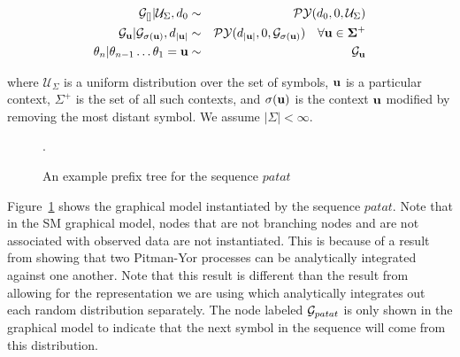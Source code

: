 \begin{eqnarray*}
	\G_{[]} | \mathcal{U}_{\Sigma}, d_0 &\sim& \PY(d_0, 0, \mathcal{U}_{\Sigma }) \\
	\G_{\bf{u}} | \G_{\sigma(\bf{u})}, d_{|\bf{u}|} &\sim& \PY(d_{|\bf{u}|}, 0, \G_{\sigma(\bf{u})}) \hspace{.35cm} \forall \bf{u} \in \Sigma^+\\
	\theta_n | \theta_{n-1}  \ldots \theta_1 = \bf{u} &\sim& \G_{\bf{u}}
\end{eqnarray*}

where $\mathcal{U}_{\Sigma }$ is a uniform distribution over the set of symbols, $\bf{u}$ is a particular context, $\Sigma^+$ is the set of all such contexts, and $\sigma(\bf{u})$ is the context $\bf{u}$ modified by removing the most distant symbol.  We assume $| \Sigma | < \infty$. 

\begin{figure}[t] 
	\begin{center}
		\caption{An example prefix tree for the sequence $patat$}.
		\label{figprefixtree}
	\end{center} 
\end{figure} 

Figure~\ref{figprefixtree} shows the graphical model instantiated by the sequence $patat$.  Note that in the SM graphical model, nodes that are not branching nodes and are not associated with observed data are not instantiated.  This is because of a result from \cite{Pitman1999,Ho2006} showing that two Pitman-Yor processes can be analytically integrated against one another.  Note that this result is different than the result from \cite{Blackwell1973} allowing for the representation we are using which analytically integrates out each random distribution separately.  The node labeled $\G_{patat}$ is only shown in the graphical model to indicate that the next symbol in the sequence will come from this distribution.

